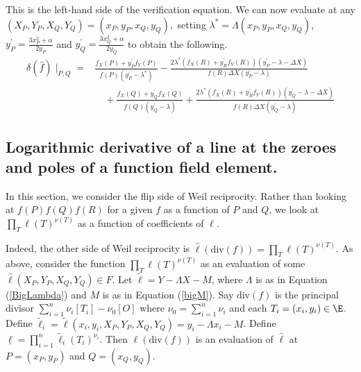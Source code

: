 \documentclass[11pt,letterpaper]{article}
\theoremstyle{definition}
\newcommand{\6}{\mathbf}
\newcommand{\7}{\mathcal}
\begin{document}
This is the left-hand side of the verification equation. We can now evaluate at any \\
$(X_P, Y_P, X_Q, Y_Q) = (x_P, y_P, x_Q, y_Q),$ 
setting $\lambda^* = \Lambda(x_P,y_P, x_Q, y_Q)$, $y_P^\prime = \frac{3x_P^2+\alpha}{2y_P}$ and  $y_Q^\prime = \frac{3x_Q^2+\alpha}{2y_Q}$ to obtain the following.
\begin{align}
\delta(\widehat{f})\mid_{P,Q} =& 
\frac{f_X(P) + y_P^\prime f_Y(P)}{f(P)(y_P^\prime - \lambda^*)}- 
\frac{2\lambda^*(f_X(R) + y_R^\prime f_Y(R))(y_P^\prime - \lambda - \Delta X)}{f(R)\Delta X(y_P^\prime - \lambda)}  \\
&  \quad + \frac{f_X(Q) + y_Q^\prime f_X(Q)}{f(Q)(y_Q^\prime - \lambda)} + 
\frac{2\lambda^*(f_X(R) + y_R^\prime f_Y(R))(y_Q^\prime - \lambda - \Delta X)}{f(R) \Delta X(y_Q^\prime - \lambda)} \label{deltafhat}
\end{align}

\subsection{Logarithmic derivative of a line at the zeroes and poles of a function field element.}

In this section, we consider the flip side of Weil reciprocity. Rather than looking at $f(P)f(Q)f(R)$ for a given $f$ as a function of $P$ and $Q$, we look at $\prod_T \ell(T)^{\nu(T)}$ as a function of coefficients of $\ell$.

Indeed, the other side of Weil reciprocity is $\widehat{\ell}(\text{div}(f)) = \prod_T \ell(T)^{\nu(T)}$.
As above, consider the function $\prod_T \ell(T)^{\nu(T)}$ as an evaluation of some $\widehat{\ell}(X_P, Y_P, X_Q, Y_Q) \in F$. 
Let $\widetilde{\ell} = Y - \Lambda X - M$, where $\Lambda$ is as in Equation (\ref{BigLambda}) and $M$ is as in Equation (\ref{bigM}). Say $\text{div}(f)$ is the principal divisor $\sum_{i=1}^{n} \nu_i [T_i] - \nu_0[O]$ where $\nu_0 = \sum_{i=1}^{n} \nu_i$ and each $T_i = (x_i, y_i) \in \E$. Define $\widetilde{\ell}_i = \widetilde{\ell}(x_i, y_i, X_P, Y_P, X_Q, Y_Q) = y_i - \Lambda x_i - M$. Define $\underline{\ell} = \prod_{i=1}^{n} \widetilde{\ell}_i(T_i)^{\nu_i}$. 
Then $\ell(\text{div}(f))$ is an evaluation of $\widehat{\ell}$ at $P = (x_P, y_P)$ and $Q=(x_Q, y_Q)$.  
\end{document}
